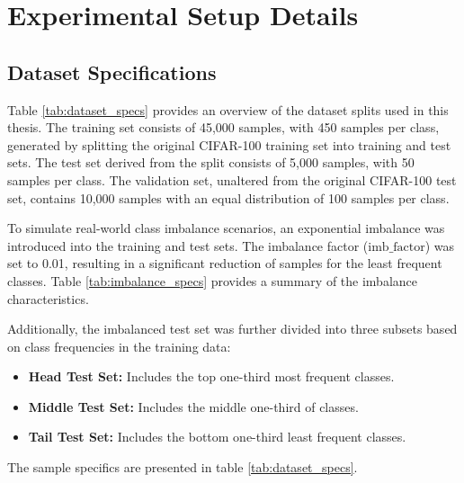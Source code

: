 \chapter{Experimental Setup Details}
\section{Dataset Specifications}
Table \ref{tab:dataset_specs} provides an overview of the dataset splits used in this thesis. The training set consists of 45,000 samples, with 450 samples per class, generated by splitting the original CIFAR-100 training set into training and test sets. The test set derived from the split consists of 5,000 samples, with 50 samples per class. The validation set, unaltered from the original CIFAR-100 test set, contains 10,000 samples with an equal distribution of 100 samples per class.

To simulate real-world class imbalance scenarios, an exponential imbalance was introduced into the training and test sets. The imbalance factor (\(\text{imb\_factor}\)) was set to 0.01, resulting in a significant reduction of samples for the least frequent classes. Table \ref{tab:imbalance_specs} provides a summary of the imbalance characteristics.

Additionally, the imbalanced test set was further divided into three subsets based on class frequencies in the training data:

\begin{itemize}
    \item \textbf{Head Test Set:} Includes the top one-third most frequent classes.
    \item \textbf{Middle Test Set:} Includes the middle one-third of classes.
    \item \textbf{Tail Test Set:} Includes the bottom one-third least frequent classes.
\end{itemize}

The sample specifics are presented in table \ref{tab:dataset_specs}.



